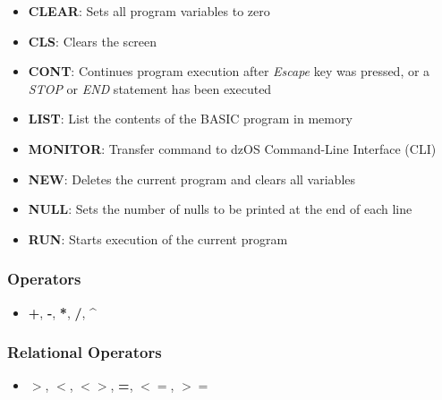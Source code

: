         \begin{itemize}
            \item \textbf{CLEAR}: Sets all program variables to zero
            \item \textbf{CLS}: Clears the screen
            \item \textbf{CONT}: Continues program execution after \textit{Escape}
            key was pressed, or a \textit{STOP} or \textit{END} statement has
            been executed
            \item \textbf{LIST}: List the contents of the BASIC program in memory
            \item \textbf{MONITOR}: Transfer command to dzOS Command-Line
            Interface (CLI)
            \item \textbf{NEW}: Deletes the current program and clears all
            variables
            \item \textbf{NULL}: Sets the number of nulls to be printed at the
            end of each line
            \item \textbf{RUN}: Starts execution of the current program
        \end{itemize}

        \subsubsection{Operators}

        \begin{itemize}
            \item \textbf{+}, \textbf{-}, \textbf{*}, \textbf{/},
            \textbf{\textasciicircum}
        \end{itemize}

        \subsubsection{Relational Operators}

        \begin{itemize}
            \item \textbf{$>$}, \textbf{$<$}, \textbf{$<>$}, \textbf{=},
            \textbf{$<=$}, \textbf{$>=$}
        \end{itemize}

